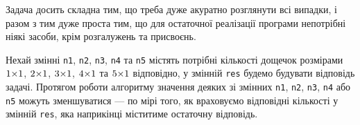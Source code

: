 \documentclass[14pt,a4paper]{extarticle}
\begin{document}
\Tutorial	Задача досить складна тим, що треба дуже акуратно розглянути всі випадки, і разом з тим дуже проста тим, що для остаточної реалізації програми не\nolinebreak[3] потрібні ніякі засоби, крім розгалужень та присвоєнь. 

Нехай змінні \texttt{n1}, \texttt{n2}, \texttt{n3}, \texttt{n4} та \texttt{n5} містять потрібні кількості дощечок розмірами $1{\times}1$, $2{\times}1$, $3{\times}1$, $4{\times}1$ та $5{\times}1$ відповідно, у змінній \texttt{res} будемо будувати відповідь задачі. Протягом роботи алгоритму значення деяких зі змінних \texttt{n1}, \texttt{n2}, \texttt{n3}, \texttt{n4} або \texttt{n5} можуть зменшуватися — по мірі того, як враховуємо відповідні кількості у змінній \texttt{res}, яка наприкінці міститиме остаточну відповідь. 
\end{document}
